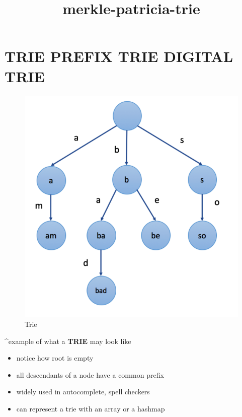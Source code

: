 \documentclass[11pt]{article}
\title{merkle-patricia-trie}
\providecommand{\tightlist}{%
      \setlength{\itemsep}{0pt}\setlength{\parskip}{0pt}}
\begin{document}
    
    \maketitle
    
    

    
    \hypertarget{trie-prefix-trie-digital-trie}{%
\section{TRIE \textbar{} PREFIX TRIE \textbar{} DIGITAL
TRIE}\label{trie-prefix-trie-digital-trie}}

    \begin{figure}
\centering
\includegraphics{../static/trie.png}
\caption{Trie}
\end{figure}

    \^{}example of what a \textbf{TRIE} may look like

\begin{itemize}
\tightlist
\item
  notice how root is empty
\item
  all descendants of a node have a common prefix
\item
  widely used in autocomplete, spell checkers
\item
  can represent a trie with an array or a hashmap
\end{itemize}
\end{document}
